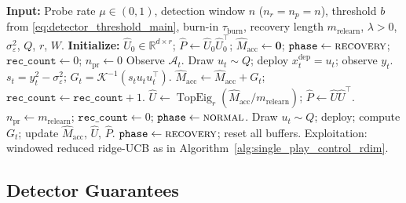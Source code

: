 \documentclass{article}
\newcommand{\R}{\mathbb{R}}
\newcommand{\cA}{\mathcal{A}}
\DeclareMathOperator{\TopEig}{TopEig}
\begin{document}
\begin{algorithm}[!htpb]
  \caption{Adaptive Single-Play Subspace-Aware Control (Unknown Segment Boundaries)}
  \label{alg:adaptive_reset_control_main}
  \begin{algorithmic}[1]
  \State \textbf{Input:} Probe rate $\mu\in(0,1)$, detection window $n$ ($n_r=n_p=n$),
         threshold $b$ from \eqref{eq:detector_threshold_main},
         burn-in $\tau_{\mathrm{burn}}$, recovery length $m_{\mathrm{relearn}}$,
         $\lambda>0$, $\sigma_\varepsilon^2$, $Q$, $r$, $W$.
  \State \textbf{Initialize:} $\widehat U_0\in\R^{d\times r}$;
         $\widehat P\leftarrow\widehat U_0\widehat U_0^\top$;
         $\widehat M_{\mathrm{acc}}\leftarrow\mathbf{0}$;
         $\mathtt{phase}\leftarrow\textsc{recovery}$;
         $\mathtt{rec\_count}\leftarrow 0$; $n_{\mathrm{pr}}\leftarrow 0$
      \State Observe $\cA_t$.
          \State Draw $u_t\sim Q$; deploy $x_t^{\mathrm{dep}}=u_t$; observe $y_t$.
          \State $s_t = y_t^2-\sigma_\varepsilon^2$; $G_t = \mathcal{K}^{-1}(s_t u_t u_t^\top)$.
          \State $\widehat M_{\mathrm{acc}}\leftarrow \widehat M_{\mathrm{acc}}+G_t$; $\mathtt{rec\_count}\leftarrow\mathtt{rec\_count}+1$.
              \State $\widehat U\leftarrow\TopEig_r(\widehat M_{\mathrm{acc}}/m_{\mathrm{relearn}})$;
                     $\widehat P\leftarrow\widehat U\widehat U^\top$.
              \State $n_{\mathrm{pr}}\leftarrow m_{\mathrm{relearn}}$;
                     $\mathtt{rec\_count}\leftarrow 0$;
                     $\mathtt{phase}\leftarrow\textsc{normal}$.
          \EndIf
      \Else
              \State Draw $u_t\sim Q$; deploy; compute $G_t$; update $\widehat M_{\mathrm{acc}}$, $\widehat U$, $\widehat P$.
                  \State $\mathtt{phase}\leftarrow\textsc{recovery}$; reset all buffers.
              \EndIf
          \Else
              \State Exploitation: windowed reduced ridge-UCB as in Algorithm~\ref{alg:single_play_control_rdim}.
          \EndIf
      \EndIf
  \EndFor
  \end{algorithmic}
\end{algorithm}

\subsection{Detector Guarantees}
\label{app:detector_guarantees}
\end{document}
